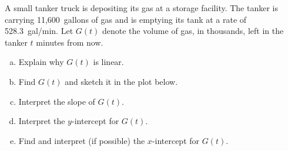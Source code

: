 \documentclass[11pt,letterpaper]{article}
\begin{document}

 A small tanker truck is depositing its gas at a storage facility. The tanker is carrying 11,600~gallons of gas and is emptying its tank at a rate of 528.3~gal/min. Let $G(t)$ denote the volume of gas, in thousands, left in the tanker $t$ minutes from now. 
	\begin{enumerate}[(a)]
	\item Explain why $G(t)$ is linear. 
	\item Find $G(t)$ and sketch it in the plot below. 
	\item Interpret the slope of $G(t)$.
	\item Interpret the $y$-intercept for $G(t)$.
	\item Find and interpret (if possible) the $x$-intercept for $G(t)$. 
	\end{enumerate} \pspace
\end{document}
